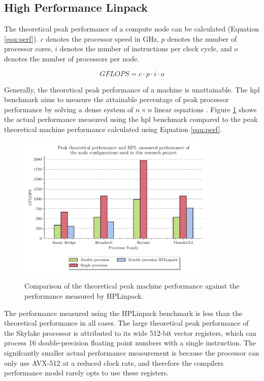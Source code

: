 \documentclass[a4paper,11pt]{report}
\begin{document}
\subsection{High Performance Linpack}
The theoretical peak performance of a compute node can be calculated (Equation \ref{equ:perf}). $c$ denotes the processor speed in GHz, $p$ denotes the number of processor cores, $i$ denotes the number of instructions per clock cycle, and $o$ denotes the number of processors per node. 

\begin{equation}
GFLOPS = c \cdot p \cdot i \cdot o 
\label{equ:perf}
\end{equation}
\par
Generally, the theoretical peak performance of a machine is unattainable. The \gls{hpl} benchmark aims to measure the attainable percentage of peak processor performance by solving a dense system of $n\times n$ linear equations \cite{dongarra2008linpack}. Figure \ref{fig:hpl} shows the actual performance measured using the \gls{hpl} benchmark compared to the peak theoretical machine performance calculated using Equation \ref{equ:perf}. 
\par
\begin{figure}[htbp]
\begin{center}
\includegraphics[width=0.85\textwidth]{img/hpl.pdf}
\caption[High performance Linpack benchmark]{Comparison of the theoretical peak machine performance against the performance measured by HPLinpack. }
\label{fig:hpl}
\end{center}
\end{figure}
\par
The performance measured using the HPLinpack benchmark is less than the theoretical performance in all cases. The large theoretical peak performance of the Skylake processor is attributed to its wide 512-bit vector registers, which can process 16 double-precision floating point numbers with a single instruction. The signifcantly smaller actual performance measurement is because the processor can only use AVX-512 at a reduced clock rate, and therefore the compilers performance model rarely opts to use these registers. 
\end{document}
